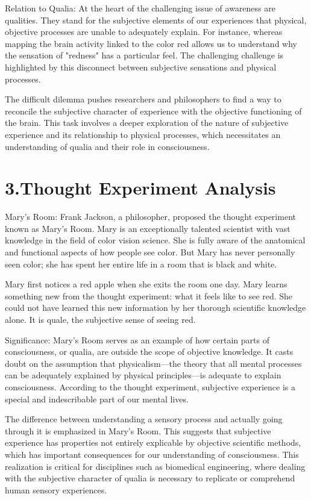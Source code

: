 \documentclass{article}
\begin{document}
Relation to Qualia:
At the heart of the challenging issue of awareness are qualities. They stand for the subjective elements of our experiences that physical, objective processes are unable to adequately explain. For instance, whereas mapping the brain activity linked to the color red allows us to understand why the sensation of "redness" has a particular feel. The challenging challenge is highlighted by this disconnect between subjective sensations and physical processes.

The difficult dilemma pushes researchers and philosophers to find a way to reconcile the subjective character of experience with the objective functioning of the brain. This task involves a deeper exploration of the nature of subjective experience and its relationship to physical processes, which necessitates an understanding of qualia and their role in consciousness.


\section*{3.Thought Experiment Analysis}
Mary's Room:
Frank Jackson, a philosopher, proposed the thought experiment known as Mary's Room. Mary is an exceptionally talented scientist with vast knowledge in the field of color vision science. She is fully aware of the anatomical and functional aspects of how people see color. But Mary has never personally seen color; she has spent her entire life in a room that is black and white.

Mary first notices a red apple when she exits the room one day. Mary learns something new from the thought experiment: what it feels like to see red. She could not have learned this new information by her thorough scientific knowledge alone. It is quale, the subjective sense of seeing red.


Significance:
Mary's Room serves as an example of how certain parts of consciousness, or qualia, are outside the scope of objective knowledge. It casts doubt on the assumption that physicalism—the theory that all mental processes can be adequately explained by physical principles—is adequate to explain consciousness. According to the thought experiment, subjective experience is a special and indescribable part of our mental lives.

The difference between understanding a sensory process and actually going through it is emphasized in Mary's Room. This suggests that subjective experience has properties not entirely explicable by objective scientific methods, which has important consequences for our understanding of consciousness. This realization is critical for disciplines such as biomedical engineering, where dealing with the subjective character of qualia is necessary to replicate or comprehend human sensory experiences.
\end{document}
